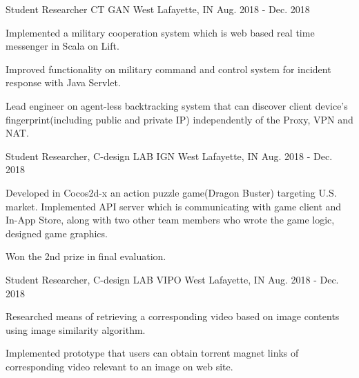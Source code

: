 


\begin{cventries}


\cventry
{Student Researcher} %
{CT GAN} %
{West Lafayette, IN} %
{Aug. 2018 - Dec. 2018} %
{ %
\begin{cvitems}
\item {Implemented a military cooperation system which is web based real time messenger in Scala on Lift.}
\item {Improved functionality on military command and control system for incident response with Java Servlet.}
\item {Lead engineer on agent-less backtracking system that can discover client device's fingerprint(including public and private IP) independently of the Proxy, VPN and NAT.}
\end{cvitems}
}


\cventry
{Student Researcher, C-design LAB} %
{IGN} %
{West Lafayette, IN} %
{Aug. 2018 - Dec. 2018} %
{ %
\begin{cvitems}
\item {Developed in Cocos2d-x an action puzzle game(Dragon Buster) targeting U.S. market. Implemented API server which is communicating with game client and In-App Store, along with two other team members who wrote the game logic, designed game graphics.}
\item {Won the 2nd prize in final evaluation.}
\end{cvitems}
}


\cventry
{Student Researcher, C-design LAB} %
{VIPO} %
{West Lafayette, IN} %
{Aug. 2018 - Dec. 2018} %
{ %
\begin{cvitems}
\item {Researched means of retrieving a corresponding video based on image contents using image similarity algorithm.}
\item {Implemented prototype that users can obtain torrent magnet links of corresponding video relevant to an image on web site.}
\end{cvitems} 
}


\end{cventries}
